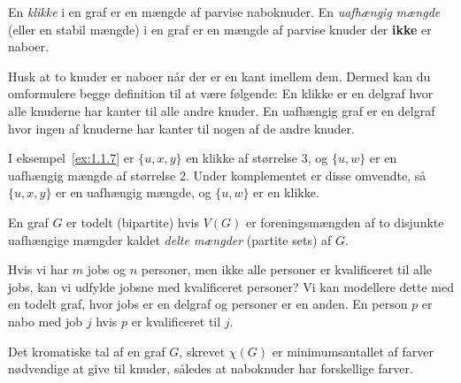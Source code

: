 \begin{definition}
En \textit{klikke} i en graf er en mængde af parvise naboknuder. En \textit{uafhængig mængde} (eller en stabil mængde) i en graf er en mængde af parvise knuder der \textbf{ikke} er naboer.
\end{definition}

Husk at to knuder er naboer når der er en kant imellem dem. Dermed kan du omformulere begge definition til at være følgende: En klikke er en delgraf hvor alle knuderne har kanter til alle andre knuder. En uafhængig graf er en delgraf hvor ingen af knuderne har kanter til nogen af de andre knuder.

I eksempel~\ref{ex:1.1.7} er $\{u,x,y\}$ en klikke af størrelse 3, og $\{u,w\}$ er en uafhængig mængde af størrelse 2. Under komplementet er disse omvendte, så $\{u,x,y\}$ er en uafhængig mængde, og $\{u,w\}$ er en klikke.

\begin{definition}
En graf $G$ er todelt (bipartite) hvis $V(G)$ er foreningsmængden af to disjunkte uafhængige mængder kaldet \textit{delte mængder} (partite sets) af $G$.
\end{definition}

\begin{example}
Hvis vi har $m$ jobs og $n$ personer, men ikke alle personer er kvalificeret til alle jobs, kan vi udfylde jobsne med kvalificeret personer? Vi kan modellere dette med en todelt graf, hvor jobs er en delgraf og personer er en anden. En person $p$ er nabo med job $j$ hvis $p$ er kvalificeret til $j$.
\begin{center}
\end{center}
\end{example}

\begin{definition}
Det kromatiske tal af en graf $G$, skrevet $\chi(G)$ er minimumsantallet af farver nødvendige at give til knuder, således at naboknuder har forskellige farver.
\end{definition}

